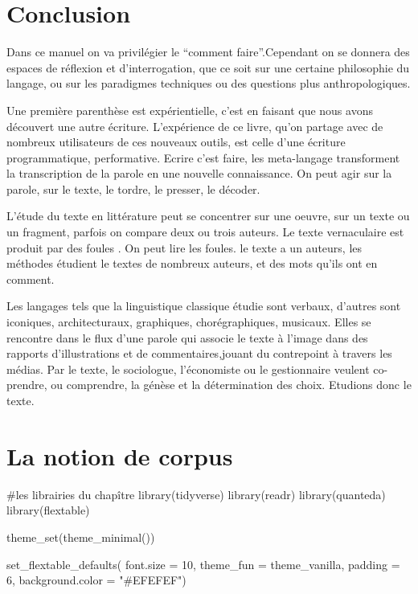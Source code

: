 \documentclass[
  letterpaper,
  DIV=11,
  numbers=noendperiod]{scrreprt}
\newenvironment{Shaded}{\begin{snugshade}}{\end{snugshade}}
\newcommand{\AttributeTok}[1]{\textcolor[rgb]{0.40,0.45,0.13}{#1}}
\newcommand{\CommentTok}[1]{\textcolor[rgb]{0.37,0.37,0.37}{#1}}
\newcommand{\DecValTok}[1]{\textcolor[rgb]{0.68,0.00,0.00}{#1}}
\newcommand{\FunctionTok}[1]{\textcolor[rgb]{0.28,0.35,0.67}{#1}}
\newcommand{\NormalTok}[1]{\textcolor[rgb]{0.00,0.23,0.31}{#1}}
\newcommand{\StringTok}[1]{\textcolor[rgb]{0.13,0.47,0.30}{#1}}
\begin{document}

\chapter{Conclusion}\label{conclusion}

Dans ce manuel on va privilégier le ``comment faire''.Cependant on se
donnera des espaces de réflexion et d'interrogation, que ce soit sur une
certaine philosophie du langage, ou sur les paradigmes techniques ou des
questions plus anthropologiques.

Une première parenthèse est expérientielle, c'est en faisant que nous
avons découvert une autre écriture. L'expérience de ce livre, qu'on
partage avec de nombreux utilisateurs de ces nouveaux outils, est celle
d'une écriture programmatique, performative. Ecrire c'est faire, les
meta-langage transforment la transcription de la parole en une nouvelle
connaissance. On peut agir sur la parole, sur le texte, le tordre, le
presser, le décoder.

L'étude du texte en littérature peut se concentrer sur une oeuvre, sur
un texte ou un fragment, parfois on compare deux ou trois auteurs. Le
texte vernaculaire est produit par des foules . On peut lire les foules.
le texte a un auteurs, les méthodes étudient le textes de nombreux
auteurs, et des mots qu'ils ont en comment.

Les langages tels que la linguistique classique étudie sont verbaux,
d'autres sont iconiques, architecturaux, graphiques, chorégraphiques,
musicaux. Elles se rencontre dans le flux d'une parole qui associe le
texte à l'image dans des rapports d'illustrations et de
commentaires,jouant du contrepoint à travers les médias. Par le texte,
le sociologue, l'économiste ou le gestionnaire veulent co-prendre, ou
comprendre, la génèse et la détermination des choix. Etudions donc le
texte.


\chapter{La notion de corpus}\label{la-notion-de-corpus}

\begin{Shaded}
\begin{Highlighting}[]
\CommentTok{\#les librairies du chapître}
\FunctionTok{library}\NormalTok{(tidyverse)}
\FunctionTok{library}\NormalTok{(readr)}
\FunctionTok{library}\NormalTok{(quanteda)}
\FunctionTok{library}\NormalTok{(flextable)}

\FunctionTok{theme\_set}\NormalTok{(}\FunctionTok{theme\_minimal}\NormalTok{()) }

\FunctionTok{set\_flextable\_defaults}\NormalTok{(}
  \AttributeTok{font.size =} \DecValTok{10}\NormalTok{, }\AttributeTok{theme\_fun =}\NormalTok{ theme\_vanilla,}
  \AttributeTok{padding =} \DecValTok{6}\NormalTok{,}
  \AttributeTok{background.color =} \StringTok{"\#EFEFEF"}\NormalTok{)}
\end{Highlighting}
\end{Shaded}
\end{document}
